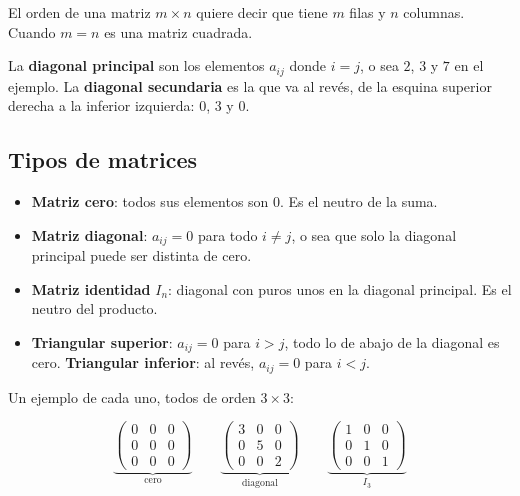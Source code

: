 \documentclass[11pt,letterpaper]{article}
\begin{document}
El orden de una matriz $m \times n$ quiere decir que tiene $m$ filas y
$n$ columnas. Cuando $m = n$ es una matriz cuadrada.

La \textbf{diagonal principal} son los elementos $a_{ij}$ donde
$i = j$, o sea $2$, $3$ y $7$ en el ejemplo. La
\textbf{diagonal secundaria} es la que va al revés, de la esquina
superior derecha a la inferior izquierda: $0$, $3$ y $0$.


\subsection*{Tipos de matrices}

\begin{itemize}[itemsep=0.3em]
    \item \textbf{Matriz cero}: todos sus elementos son $0$. Es el
          neutro de la suma.
    \item \textbf{Matriz diagonal}: $a_{ij} = 0$ para todo
          $i \neq j$, o sea que solo la diagonal principal puede ser
          distinta de cero.
    \item \textbf{Matriz identidad} $I_n$: diagonal con puros unos en
          la diagonal principal. Es el neutro del producto.
    \item \textbf{Triangular superior}: $a_{ij} = 0$ para $i > j$,
          todo lo de abajo de la diagonal es cero.
          \textbf{Triangular inferior}: al revés, $a_{ij} = 0$ para
          $i < j$.
\end{itemize}

Un ejemplo de cada uno, todos de orden $3 \times 3$:

\[
    \underbrace{\begin{pmatrix}
        0 & 0 & 0 \\ 0 & 0 & 0 \\ 0 & 0 & 0
    \end{pmatrix}}_{\text{cero}}
    \qquad
    \underbrace{\begin{pmatrix}
        3 & 0 & 0 \\ 0 & 5 & 0 \\ 0 & 0 & 2
    \end{pmatrix}}_{\text{diagonal}}
    \qquad
    \underbrace{\begin{pmatrix}
        1 & 0 & 0 \\ 0 & 1 & 0 \\ 0 & 0 & 1
    \end{pmatrix}}_{I_3}
\]
\end{document}
